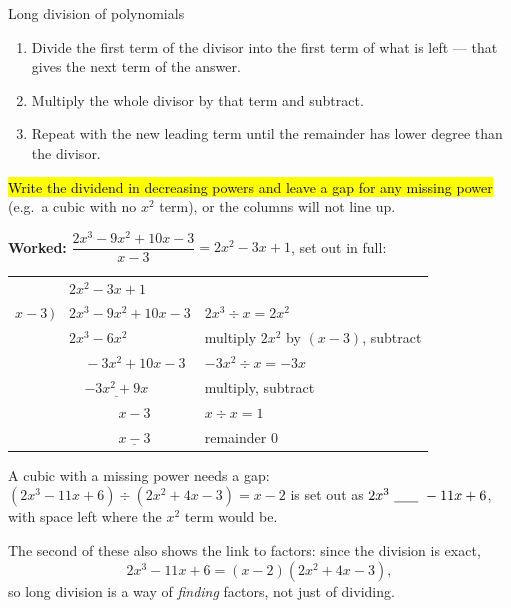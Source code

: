\documentclass[11pt]{article}
\newcommand{\key}[1]{\hl{#1}}
\newcommand{\wex}[1]{\textbf{\color{lilacdeep}Worked:} #1}
\begin{document}
\begin{methodbox}{Long division of polynomials}
\begin{enumerate}[topsep=1pt,itemsep=0pt,leftmargin=*]
\item Divide the first term of the divisor into the first term of what is left --- that gives the next term of the answer.
\item Multiply the whole divisor by that term and subtract.
\item Repeat with the new leading term until the remainder has lower degree than the divisor.
\end{enumerate}
\key{Write the dividend in decreasing powers and leave a gap for any missing power} (e.g.\ a cubic with no $x^{2}$ term), or the columns will not line up.
\end{methodbox}

\wex{$\dfrac{2x^{3}-9x^{2}+10x-3}{x-3}=2x^{2}-3x+1$, set out in full:}

\vspace{-0.4em}
\begin{center}
\begin{tabular}{@{}r@{\ }l@{\qquad}l@{}}
& \underline{$2x^{2}-3x+1$} & \\
$x-3\,\big)$ & $2x^{3}-9x^{2}+10x-3$ & \small\color{greyish}$2x^{3}\div x=2x^{2}$\\
& \underline{$2x^{3}-6x^{2}$}\hspace{2.55cm} & \small\color{greyish}multiply $2x^{2}$ by $(x-3)$, subtract\\
& $\ \ \ \ \ -3x^{2}+10x-3$ & \small\color{greyish}$-3x^{2}\div x=-3x$\\
& $\ \ \ \ \ \underline{-3x^{2}+9x}$\hspace{1.25cm} & \small\color{greyish}multiply, subtract\\
& $\ \ \ \ \ \ \ \ \ \ \ \ \ \ \ \ x-3$ & \small\color{greyish}$x\div x=1$\\
& $\ \ \ \ \ \ \ \ \ \ \ \ \ \ \ \ \underline{x-3}$ & \small\color{greyish}remainder $0$\\
\end{tabular}
\end{center}
\vspace{-0.3em}

A cubic with a missing power needs a gap: $(2x^{3}-11x+6)\div(2x^{2}+4x-3)=x-2$ is set out as $2x^{3}\ \underline{\hspace{6mm}}\ -11x+6$, with space left where the $x^{2}$ term would be.

The second of these also shows the link to factors: since the division is exact,
\[2x^{3}-11x+6=(x-2)(2x^{2}+4x-3),\]
so long division is a way of \emph{finding} factors, not just of dividing.
\end{document}
